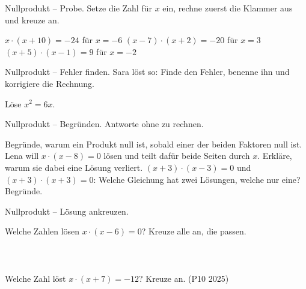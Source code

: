 \begin{aufgabe}{Nullprodukt -- Probe. Setze die Zahl für $x$ ein, rechne zuerst die
Klammer aus und kreuze an.}
\begin{teile}
\teil $x \cdot (x + 10) = -24$ \quad für $x = -6$ \hfill {}
\teil $(x - 7) \cdot (x + 2) = -20$ \quad für $x = 3$ \hfill {}
\teil $(x + 5) \cdot (x - 1) = 9$ \quad für $x = -2$ \hfill {}
\end{teile}
\end{aufgabe}

\begin{aufgabe}{Nullprodukt -- Fehler finden. Sara löst so:}
Finde den Fehler, benenne ihn und korrigiere die Rechnung.

\begin{teile}
\teil Löse $x^2 = 6x$.
\end{teile}
\end{aufgabe}

\begin{aufgabe}{Nullprodukt -- Begründen. Antworte ohne zu rechnen.}
\begin{teile}
\teil Begründe, warum ein Produkt null ist, sobald einer der beiden Faktoren null ist.
\teil Lena will $x \cdot (x - 8) = 0$ lösen und teilt dafür beide Seiten durch $x$.
Erkläre, warum sie dabei eine Lösung verliert.
\teil $(x + 3) \cdot (x - 3) = 0$ und $(x + 3) \cdot (x + 3) = 0$: Welche Gleichung
hat zwei Lösungen, welche nur eine? Begründe.
\end{teile}
\end{aufgabe}

\begin{aufgabe}{Nullprodukt -- Lösung ankreuzen.}
\begin{teile}
\teil Welche Zahlen lösen $x \cdot (x - 6) = 0$? Kreuze alle an, die passen. \\
 \\  \\  \\ 
\teil Welche Zahl löst $x \cdot (x + 7) = -12$? Kreuze an. \hfill (P10 2025) \\
 \\  \\  \\ 
\end{teile}
\end{aufgabe}
